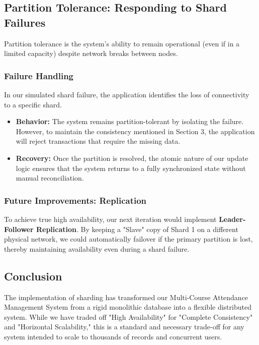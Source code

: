 \documentclass[conference]{IEEEtran}
\begin{document}
\subsection{Partition Tolerance: Responding to Shard Failures}
Partition tolerance is the system's ability to remain operational (even if in a limited capacity) despite network breaks between nodes.

\subsubsection{Failure Handling}
In our simulated shard failure, the application identifies the loss of connectivity to a specific shard. 
\begin{itemize}
    \item \textbf{Behavior:} The system remains partition-tolerant by isolating the failure. However, to maintain the consistency mentioned in Section 3, the application will reject transactions that require the missing data. 
    \item \textbf{Recovery:} Once the partition is resolved, the atomic nature of our update logic ensures that the system returns to a fully synchronized state without manual reconciliation.
\end{itemize}

\subsubsection{Future Improvements: Replication}
To achieve true high availability, our next iteration would implement \textbf{Leader-Follower Replication}. By keeping a "Slave" copy of Shard 1 on a different physical network, we could automatically failover if the primary partition is lost, thereby maintaining  availability even during a shard failure.

\subsection{Conclusion}
The implementation of sharding has transformed our Multi-Course Attendance Management System from a rigid monolithic database into a flexible distributed system. While we have traded off "High Availability" for "Complete Consistency" and "Horizontal Scalability," this is a standard and necessary trade-off for any system intended to scale to thousands of records and concurrent users.
\end{document}
